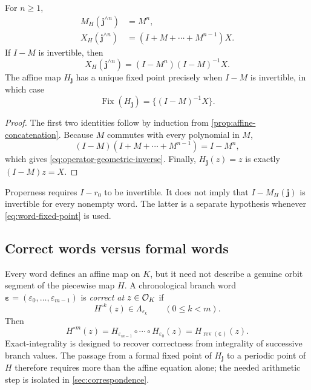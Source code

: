\begin{proposition}
\label{prop:repeated-word}
For $n\geq1$,
\begin{align}
 M_H(\mathbf j^{\wedge n})&=M^n,\\
 X_H(\mathbf j^{\wedge n})&=(I+M+\cdots+M^{n-1})X.\label{eq:operator-geometric}
\end{align}
If $I-M$ is invertible, then
\begin{equation}
\label{eq:operator-geometric-inverse}
 X_H(\mathbf j^{\wedge n})=(I-M^n)(I-M)^{-1}X.
\end{equation}
The affine map $H_{\mathbf j}$ has a unique fixed point precisely when
$I-M$ is invertible, in which case
\begin{equation}
\label{eq:word-fixed-point}
 \operatorname{Fix}(H_{\mathbf j})=\{(I-M)^{-1}X\}.
\end{equation}
\end{proposition}

\begin{proof}
The first two identities follow by induction from
\cref{prop:affine-concatenation}.  Because $M$ commutes with every polynomial
in $M$,
\[
 (I-M)(I+M+\cdots+M^{n-1})=I-M^n,
\]
which gives \cref{eq:operator-geometric-inverse}.  Finally,
$H_{\mathbf j}(z)=z$ is exactly $(I-M)z=X$.
\end{proof}

\begin{remark}
Properness requires $I-r_0$ to be invertible.  It does not imply that
$I-M_H(\mathbf j)$ is invertible for every nonempty word.  The latter is a
separate hypothesis whenever \cref{eq:word-fixed-point} is used.
\end{remark}

\subsection{Correct words versus formal words}

Every word defines an affine map on $K$, but it need not describe a genuine
orbit segment of the piecewise map $H$.  A chronological branch word
$\boldsymbol\varepsilon=(\varepsilon_0,\ldots,\varepsilon_{m-1})$ is
\emph{correct at $z\in\mathcal O_K$} if
\[
 H^{\circ k}(z)\in\Lambda_{\varepsilon_k}
 \qquad(0\leq k<m).
\]
Then
\begin{equation}
\label{eq:chronological-composition}
 H^{\circ m}(z)
 =H_{\varepsilon_{m-1}}\circ\cdots\circ H_{\varepsilon_0}(z)
 =H_{\operatorname{rev}(\boldsymbol\varepsilon)}(z).
\end{equation}
Exact-integrality is designed to recover correctness from integrality of
successive branch values.  The passage from a formal fixed point of
$H_{\mathbf j}$ to a periodic point of $H$ therefore requires more than the
affine equation alone; the needed arithmetic step is isolated in
\cref{sec:correspondence}.
